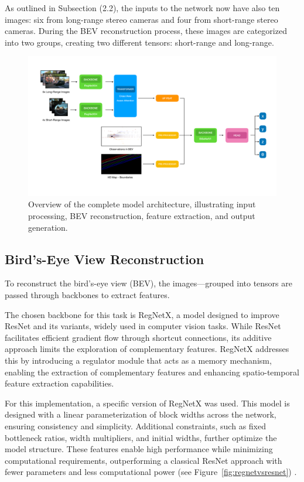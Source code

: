 As outlined in Subsection (2.2), the inputs to the network now have also ten images: six from long-range stereo cameras and four from short-range stereo cameras. During the BEV reconstruction process, these images are categorized into two groups, creating two different tensors: short-range and long-range.
\begin{figure}[H]
    \centering
    \includegraphics[width=1\linewidth]{LateX//figs/architecture2.pdf}
    \caption{Overview of the complete model architecture, illustrating input processing, BEV reconstruction, feature extraction, and output generation.}
    \label{fig:bev-architecture}
\end{figure}

\subsection*{Bird’s-Eye View Reconstruction}
To reconstruct the bird’s-eye view (BEV), the images—grouped into tensors are passed through backbones to extract features. 

The chosen backbone for this task is RegNetX, a model designed to improve ResNet and its variants, widely used in computer vision tasks. While ResNet facilitates efficient gradient flow through shortcut connections, its additive approach limits the exploration of complementary features. RegNetX addresses this by introducing a regulator module that acts as a memory mechanism, enabling the extraction of complementary features and enhancing spatio-temporal feature extraction capabilities.

For this implementation, a specific version of RegNetX was used. This model is designed with a linear parameterization of block widths across the network, ensuring consistency and simplicity. Additional constraints, such as fixed bottleneck ratios, width multipliers, and initial widths, further optimize the model structure. These features enable high performance while minimizing computational requirements, outperforming a classical ResNet approach with fewer parameters and less computational power (see Figure~\ref{fig:regnetvsresnet}) \cite{Radosavovic2020}.

